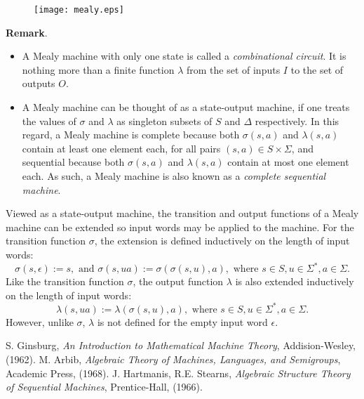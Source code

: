 \documentclass[12pt]{article}
\begin{document}
\begin{figure}[htp]
\centering
\texttt{[image: mealy.eps]}
\end{figure}

\textbf{Remark}.  
\begin{itemize}
\item
A Mealy machine with only one state is called a \emph{combinational circuit}.  It is nothing more than a finite function $\lambda$ from the set of inputs $I$ to the set of outputs $O$.
\item
A Mealy machine can be thought of as a state-output machine, if one treats the values of $\sigma$ and $\lambda$ as singleton subsets of $S$ and $\Delta$ respectively.  In this regard, a Mealy machine is complete because both $\sigma(s,a)$ and $\lambda(s,a)$ contain at least one element each, for all pairs $(s,a)\in S\times \Sigma$, and sequential because both $\sigma(s,a)$ and $\lambda(s,a)$ contain at most one element each.  As such, a Mealy machine is also known as a \emph{complete sequential machine}.
\end{itemize}

Viewed as a state-output machine, the transition and output functions of a Mealy machine can be extended so input words may be applied to the machine.  For the transition function $\sigma$, the extension is defined inductively on the length of input words: 
$$\sigma(s,\epsilon):=s, \mbox{ and } \sigma(s,ua):=\sigma(\sigma(s,u),a), \mbox{ where }s\in S, u\in \Sigma^*, a\in \Sigma.$$  Like the transition function $\sigma$, the output function $\lambda$ is also extended inductively on the length of input words: $$\lambda(s,ua):=\lambda(\sigma(s,u),a), \mbox{ where }s\in S, u\in \Sigma^*, a\in \Sigma.$$  However, unlike $\sigma$, $\lambda$ is not defined for the empty input word $\epsilon$.

\begin{thebibliography}{8}
 S. Ginsburg, {\em An Introduction to Mathematical Machine Theory}, Addision-Wesley, (1962).
 M. Arbib, \emph{Algebraic Theory of Machines, Languages, and Semigroups}, Academic Press, (1968).
 J. Hartmanis, R.E. Stearns, \emph{Algebraic Structure Theory of Sequential Machines}, Prentice-Hall, (1966).
\end{thebibliography}
\end{document}
